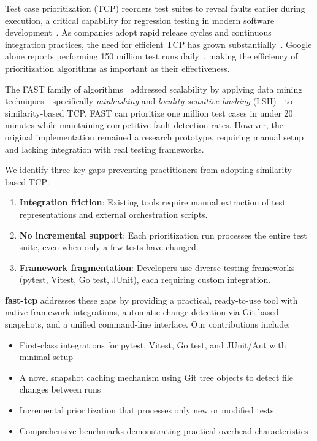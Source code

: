 \documentclass[10pt,conference]{IEEEtran}
\begin{document}
Test case prioritization (TCP) reorders test suites to reveal faults earlier during execution, a critical capability for regression testing in modern software development~\cite{miranda2018fast}. As companies adopt rapid release cycles and continuous integration practices, the need for efficient TCP has grown substantially~\cite{elbaum2014techniques}. Google alone reports performing 150 million test runs daily~\cite{memon2017taming}, making the efficiency of prioritization algorithms as important as their effectiveness.

The FAST family of algorithms~\cite{miranda2018fast} addressed scalability by applying data mining techniques---specifically \textit{minhashing} and \textit{locality-sensitive hashing} (LSH)---to similarity-based TCP. FAST can prioritize one million test cases in under 20 minutes while maintaining competitive fault detection rates. However, the original implementation remained a research prototype, requiring manual setup and lacking integration with real testing frameworks.

We identify three key gaps preventing practitioners from adopting similarity-based TCP:

\begin{enumerate}
    \item \textbf{Integration friction}: Existing tools require manual extraction of test representations and external orchestration scripts.
    \item \textbf{No incremental support}: Each prioritization run processes the entire test suite, even when only a few tests have changed.
    \item \textbf{Framework fragmentation}: Developers use diverse testing frameworks (pytest, Vitest, Go test, JUnit), each requiring custom integration.
\end{enumerate}

\textbf{fast-tcp} addresses these gaps by providing a practical, ready-to-use tool with native framework integrations, automatic change detection via Git-based snapshots, and a unified command-line interface. Our contributions include:

\begin{itemize}
    \item First-class integrations for pytest, Vitest, Go test, and JUnit/Ant with minimal setup
    \item A novel snapshot caching mechanism using Git tree objects to detect file changes between runs
    \item Incremental prioritization that processes only new or modified tests
    \item Comprehensive benchmarks demonstrating practical overhead characteristics
\end{itemize}
\end{document}
